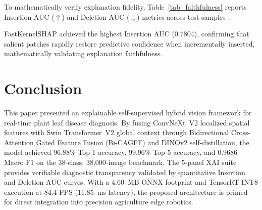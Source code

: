 \documentclass[runningheads]{llncs}
\begin{document}
To mathematically verify explanation fidelity, Table~\ref{tab_faithfulness} reports Insertion AUC ($\uparrow$) and Deletion AUC ($\downarrow$) metrics across test samples~\cite{ref_huang2024,ref_sakib2026}.

\begin{table}[!htbp]
\centering
\caption{Quantitative XAI faithfulness suite across test samples.}
\label{tab_faithfulness}
\end{table}

FastKernelSHAP achieved the highest Insertion AUC (0.7804), confirming that salient patches rapidly restore predictive confidence when incrementally inserted, mathematically validating explanation faithfulness.

\section{Conclusion}
This paper presented an explainable self-supervised hybrid vision framework for real-time plant leaf disease diagnosis. By fusing ConvNeXt~V2 localized spatial features with Swin Transformer~V2 global context through Bidirectional Cross-Attention Gated Feature Fusion (Bi-CAGFF) and DINOv2 self-distillation, the model achieved 96.88\% Top-1 accuracy, 99.96\% Top-5 accuracy, and 0.9686 Macro F1 on the 38-class, 38,000-image benchmark. The 5-panel XAI suite provides verifiable diagnostic transparency validated by quantitative Insertion and Deletion AUC curves. With a 4.60~MB ONNX footprint and TensorRT INT8 execution at 84.4 FPS (11.85~ms latency), the proposed architecture is primed for direct integration into precision agriculture edge robotics.
\end{document}
